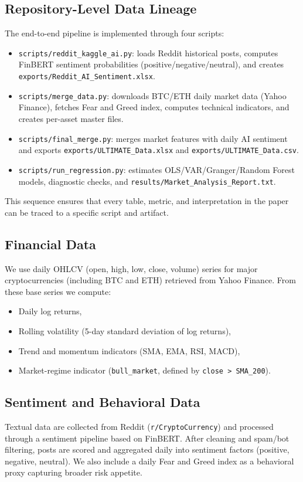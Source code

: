 \documentclass[12pt]{article}
\begin{document}
\subsection{Repository-Level Data Lineage}
The end-to-end pipeline is implemented through four scripts:
\begin{itemize}
    \item \texttt{scripts/reddit\_kaggle\_ai.py}: loads Reddit historical posts, computes FinBERT sentiment probabilities (positive/negative/neutral), and creates \texttt{exports/Reddit\_AI\_Sentiment.xlsx}.
    \item \texttt{scripts/merge\_data.py}: downloads BTC/ETH daily market data (Yahoo Finance), fetches Fear and Greed index, computes technical indicators, and creates per-asset master files.
    \item \texttt{scripts/final\_merge.py}: merges market features with daily AI sentiment and exports \texttt{exports/ULTIMATE\_Data.xlsx} and \texttt{exports/ULTIMATE\_Data.csv}.
    \item \texttt{scripts/run\_regression.py}: estimates OLS/VAR/Granger/Random Forest models, diagnostic checks, and \texttt{results/Market\_Analysis\_Report.txt}.
\end{itemize}
This sequence ensures that every table, metric, and interpretation in the paper can be traced to a specific script and artifact.

\subsection{Financial Data}
We use daily OHLCV (open, high, low, close, volume) series for major cryptocurrencies (including BTC and ETH) retrieved from Yahoo Finance. From these base series we compute:
\begin{itemize}
    \item Daily log returns,
    \item Rolling volatility (5-day standard deviation of log returns),
    \item Trend and momentum indicators (SMA, EMA, RSI, MACD),
    \item Market-regime indicator (\texttt{bull\_market}, defined by \texttt{close > SMA\_200}).
\end{itemize}

\subsection{Sentiment and Behavioral Data}
Textual data are collected from Reddit (\texttt{r/CryptoCurrency}) and processed through a sentiment pipeline based on FinBERT. After cleaning and spam/bot filtering, posts are scored and aggregated daily into sentiment factors (positive, negative, neutral). We also include a daily Fear and Greed index as a behavioral proxy capturing broader risk appetite.
\end{document}
